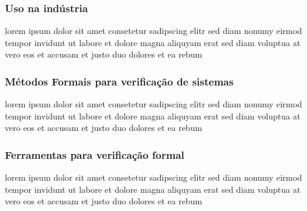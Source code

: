 \subsubsection{Uso na indústria}
lorem ipsum dolor sit amet consetetur sadipscing elitr sed diam nonumy
eirmod tempor invidunt ut labore et dolore magna aliquyam erat sed diam
voluptua at vero eos et accusam et justo duo dolores et ea rebum

\subsubsection{Métodos Formais para verificação de sistemas}
lorem ipsum dolor sit amet consetetur sadipscing elitr sed diam nonumy
eirmod tempor invidunt ut labore et dolore magna aliquyam erat sed diam
voluptua at vero eos et accusam et justo duo dolores et ea rebum

\subsubsection{Ferramentas para verificação formal}
lorem ipsum dolor sit amet consetetur sadipscing elitr sed diam nonumy
eirmod tempor invidunt ut labore et dolore magna aliquyam erat sed diam
voluptua at vero eos et accusam et justo duo dolores et ea rebum
